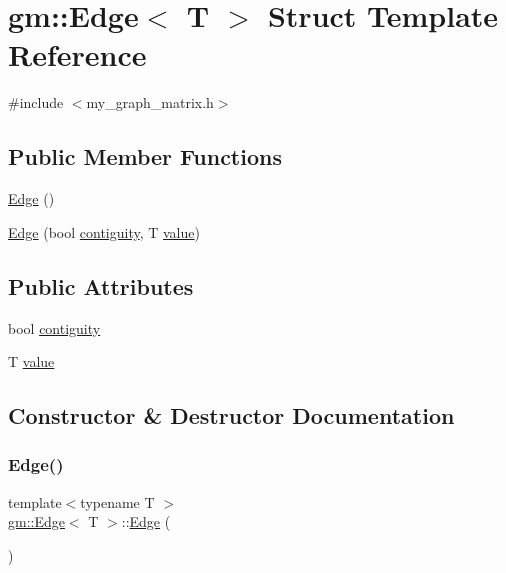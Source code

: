\hypertarget{structgm_1_1_edge}{}\section{gm\+:\+:Edge$<$ T $>$ Struct Template Reference}
\label{structgm_1_1_edge}


{\ttfamily \#include $<$my\+\_\+graph\+\_\+matrix.\+h$>$}

\subsection*{Public Member Functions}
\begin{DoxyCompactItemize}
\item 
\mbox{\hyperlink{structgm_1_1_edge_a16a869644977808f26b775d0f53128f9}{Edge}} ()
\item 
\mbox{\hyperlink{structgm_1_1_edge_a32c86440a158bba7235181bd9e1c70a3}{Edge}} (bool \mbox{\hyperlink{structgm_1_1_edge_ad9bbe3016236ffff899a0b982e96a6cd}{contiguity}}, T \mbox{\hyperlink{structgm_1_1_edge_a45d07f827a6133ea2179fdbebe0867f1}{value}})
\end{DoxyCompactItemize}
\subsection*{Public Attributes}
\begin{DoxyCompactItemize}
\item 
bool \mbox{\hyperlink{structgm_1_1_edge_ad9bbe3016236ffff899a0b982e96a6cd}{contiguity}}
\item 
T \mbox{\hyperlink{structgm_1_1_edge_a45d07f827a6133ea2179fdbebe0867f1}{value}}
\end{DoxyCompactItemize}


\subsection{Constructor \& Destructor Documentation}
\mbox{\label{structgm_1_1_edge_a16a869644977808f26b775d0f53128f9}} 
\subsubsection{\texorpdfstring{Edge()}{Edge()}\hspace{0.1cm}{\footnotesize\ttfamily [1/2]}}
{\footnotesize\ttfamily template$<$typename T $>$ \\
\mbox{\hyperlink{structgm_1_1_edge}{gm\+::\+Edge}}$<$ T $>$\+::\mbox{\hyperlink{structgm_1_1_edge}{Edge}} (\begin{DoxyParamCaption}{ }\end{DoxyParamCaption})}

